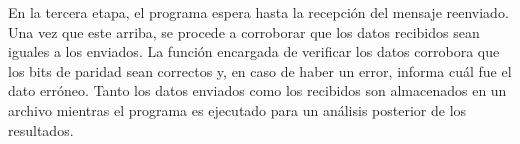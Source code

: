 	En la tercera etapa, el programa espera hasta la recepción del mensaje reenviado. Una vez que este arriba, se procede a corroborar que los datos recibidos sean iguales a los enviados. La función encargada de verificar los datos corrobora que los bits de paridad sean correctos y, en caso de haber un error, informa cuál fue el dato erróneo.
	Tanto los datos enviados como los recibidos son almacenados en un archivo mientras el programa es ejecutado para un análisis posterior de los resultados.
	
%	
%		
%	
